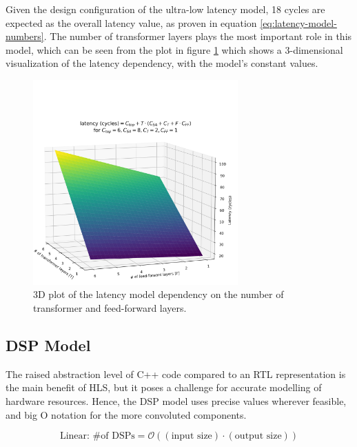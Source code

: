 Given the design configuration of the ultra-low latency model, 18 cycles are expected as the overall latency value, as proven in equation \ref{eq:latency-model-numbers}. The number of transformer layers plays the most important role in this model, which can be seen from the plot in figure \ref{fig:latency-model} which shows a 3-dimensional visualization of the latency dependency, with the model's constant values.

\begin{figure}[hpt!]
  \centering
  \includegraphics[trim={0cm 0cm 0cm 4cm}, clip, width=0.7\textwidth, center]{../logs/latency_model.png}
  \caption{3D plot of the latency model dependency on the number of transformer and feed-forward layers.}
  \label{fig:latency-model}
\end{figure}

\subsection{DSP Model}
The raised abstraction level of C++ code compared to an RTL representation is the main benefit of HLS, but it poses a challenge for accurate modelling of hardware resources. Hence, the DSP model uses precise values wherever feasible, and big O notation for the more convoluted components.

\begin{equation} \label{eq:dsp-linear}
  \text{Linear: \# of DSPs} = \mathcal{O}( (\text{input size}) \cdot (\text{output size}) )
\end{equation}

